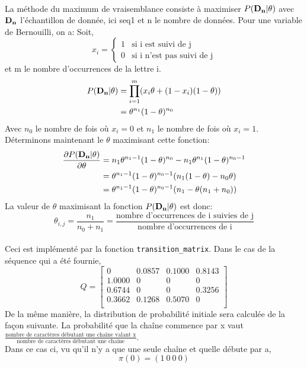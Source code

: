 \documentclass[11pt]{report}
\begin{document}
\paragraph{}
La méthode du maximum de vraisemblance consiste à maximiser $P(\bf{D}_n|\theta)$ avec $\bf{D}_n$ l'échantillon de donnée, ici seq1 et n le nombre de données. Pour une variable de Bernouilli, on a: Soit,\\ 
$$
\mbox{} x_i = \left\{
    \begin{array}{ll}
        1 & \mbox{si i est suivi de j} \\
        0 & \mbox{si i n'est pas suivi de j}
    \end{array}
\right.
$$
et m le nombre d’occurrences de la lettre i.
\begin{align*}
P(\bf{D}_n|\theta) &= \prod_{i = 1}^{m} (x_i \theta +(1-x_i)(1-\theta)) \\
                   &= \theta^{n_1} (1-\theta)^{n_0}
\end{align*}
Avec $n_0$ le nombre de fois où $x_i = 0$ et $n_1$ le nombre de fois où $x_i = 1$. Déterminons maintenant le $\theta$ maximisant cette fonction:
\begin{align*}
\frac{\partial P(\bf{D}_n|\theta)}{\partial \theta} 
&= n_1 \theta^{n_1-1} (1-\theta)^{n_0} - n_1\theta^{n_1} (1-\theta)^{n_0-1} \\
&= \theta^{n_1-1} (1-\theta)^{n_0-1} (n_1 (1-\theta) - n_0 \theta) \\
&= \theta^{n_1-1} (1-\theta)^{n_0-1} (n_1 - \theta (n_1 + n_0))
\end{align*}
La valeur de $\theta$ maximisant la fonction $P(\bf{D}_n|\theta)$ est donc:
$$ \theta_{i,j} = \frac{n_1}{n_0+n_1} = \frac{\mbox{nombre d'occurrences de i suivies de j}}{\mbox{nombre d'occurrences de i}} $$\\
Ceci est implémenté par la fonction \texttt{transition\_matrix}. Dans le cas de la séquence qui a été fournie,
$$Q =
\begin{bmatrix}
0 & 0.0857 & 0.1000 & 0.8143 \\
1.0000 & 0 & 0 & 0 \\
0.6744 & 0 & 0 & 0.3256 \\
0.3662 & 0.1268 & 0.5070 & 0 \\
\end{bmatrix}
$$ 
De la même manière, la distribution de probabilité initiale sera calculée de la façon suivante. La probabilité que la chaîne commence par x vaut $\frac{\mbox{nombre de caractères débutant une chaîne valant x}}{\mbox{nombre de caractères débutant une chaîne}}$.\\
Dans ce cas ci, vu qu'il n'y a que une seule chaîne et quelle débute par a,
$$\pi(0) = (1\ 0\ 0\ 0)$$
\end{document}
